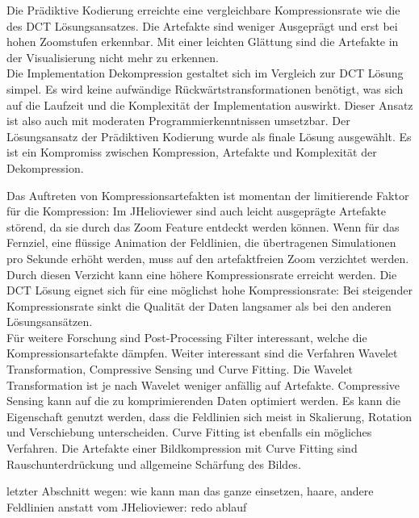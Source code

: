 Die Prädiktive Kodierung erreichte eine vergleichbare Kompressionsrate wie die des DCT Lösungsansatzes. Die Artefakte sind weniger Ausgeprägt und erst bei hohen Zoomstufen erkennbar. Mit einer leichten Glättung sind die Artefakte in der Visualisierung nicht mehr zu erkennen.\\
Die Implementation Dekompression gestaltet sich im Vergleich zur DCT Lösung simpel. Es wird keine aufwändige Rückwärtstransformationen benötigt, was sich auf die Laufzeit und die Komplexität der Implementation auswirkt. Dieser Ansatz ist also auch mit moderaten Programmierkenntnissen umsetzbar. Der Lösungsansatz der Prädiktiven Kodierung wurde als finale Lösung ausgewählt. Es ist ein Kompromiss zwischen Kompression, Artefakte und Komplexität der Dekompression.

Das Auftreten von Kompressionsartefakten ist momentan der limitierende Faktor für die Kompression: Im JHelioviewer sind auch leicht ausgeprägte Artefakte störend, da sie durch das Zoom Feature entdeckt werden können. Wenn für das Fernziel, eine flüssige Animation der Feldlinien, die übertragenen Simulationen pro Sekunde erhöht werden, muss auf den artefaktfreien Zoom verzichtet werden. Durch diesen Verzicht kann eine höhere Kompressionsrate erreicht werden. Die DCT Lösung eignet sich für eine möglichst hohe Kompressionsrate: Bei steigender Kompressionsrate sinkt die Qualität der Daten langsamer als bei den anderen Lösungsansätzen.\\
Für weitere Forschung sind Post-Processing Filter interessant, welche die Kompressionsartefakte dämpfen. Weiter interessant sind die Verfahren Wavelet Transformation, Compressive Sensing und Curve Fitting. Die Wavelet Transformation ist je nach Wavelet weniger anfällig auf Artefakte. Compressive Sensing kann auf die zu komprimierenden Daten optimiert werden. Es kann die Eigenschaft genutzt werden, dass die Feldlinien sich meist in Skalierung, Rotation und Verschiebung unterscheiden. Curve Fitting ist ebenfalls ein mögliches Verfahren. Die Artefakte einer Bildkompression mit Curve Fitting sind Rauschunterdrückung und allgemeine Schärfung des Bildes.

letzter Abschnitt wegen: wie kann man das ganze einsetzen, haare, andere Feldlinien anstatt vom JHelioviewer: redo ablauf